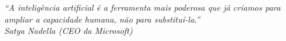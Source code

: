\begin{epigrafe}
    \vspace*{\fill}
	\begin{flushright}
		\textit{``A inteligência artificial é a ferramenta mais poderosa que já criamos para ampliar a capacidade humana, não para substituí-la.''\\
		Satya Nadella (CEO da Microsoft)}
	\end{flushright}
\end{epigrafe}
